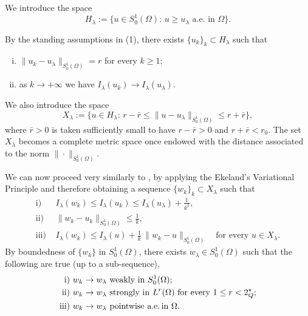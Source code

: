 \documentclass[11pt]{amsart}
\numberwithin{equation}{section} %
\theoremstyle{definition}
\newcommand{\m}{\mbox}
\begin{document}
We introduce the space
\begin{equation}\label{def:hlambda}
	H_\lambda:=\{u\in S^1_0(\Omega):\,u\geq u_\lambda \m{ a.e.~in }\Omega\}.
\end{equation}

\noindent By the standing assumptions in (1), there exists 
$\{u_k\}_k\subset H_{\lambda}$ such that 
\begin{enumerate}[i)]
	\item $\|u_k-u_\lambda\|_{S^1_0(\Omega)} = r$ for every $k\geq 1$;	
	\item as $k\to+\infty$ we have $I_\lambda(u_k)\to I_\lambda(u_\lambda)$.
\end{enumerate}
We also introduce the space
$$X_\lambda := \{u\in H_\lambda:\,r-\bar r\leq\|u-u_\lambda\|_{S^1_0(\Omega)}\leq r+\bar r\},$$
where $\bar r>0$ is taken sufficiently small to have $r-\bar r>0$ and $r+\bar r<r_0$.
The set $X_\lambda$ becomes a complete metric space once endowed with the distance associated to the norm $\|\cdot\|_{S^1_0(\Omega)}$.

We can now proceed very similarly to \cite{BiGaVe},
by applying the Ekeland's Variational Principle 
and therefore obtaining a sequence
 $\{w_k\}_k\subset X_\lambda$ such that
\begin{equation} \label{eq:EkelandCaseA}
	\begin{split}
		\mathrm{i)}&\,\, I_\lambda(w_k)\leq I_\lambda(u_k)\leq I_\lambda(u_\lambda)+\frac{1}{k^2}, \\
		\mathrm{ii)}&\,\,\|w_k-u_k\|_{S^1_0(\Omega)}\leq \frac{1}{k}, \\
		\mathrm{iii)}&\,\, I_\lambda(w_k)\leq I_\lambda(u)+\frac{1}{k}\,
		\|w_k-u\|_{S^1_0(\Omega)}\quad\text{for every $u\in X_\lambda$}.    
	\end{split}
\end{equation}
By boundedness of $\{w_k\}$ in $S^1_0(\Omega)$, there exists
$w_\lambda\in S^1_0(\Omega)$ such that 
the following are true (up to a sub-sequence),
\begin{equation} \label{eq:limitvkCaseA}
	\begin{split}
		\mathrm{i)}&\,\,\text{$w_k\to w_\lambda$ weakly in $S^1_0(\Omega)$}; \\
		\mathrm{ii)}&\,\,\text{$w_k\to w_\lambda$ strongly in $L^r(\Omega)$ for every $1\leq r<2^\star_Q$}; \\
		\mathrm{iii)}&\,\,\text{$w_k\to w_\lambda$ pointwise
			a.e.\,in $\Omega$}.
	\end{split}
\end{equation}
\end{document}
